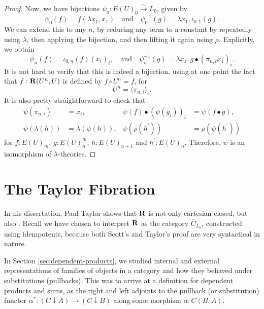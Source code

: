 \begin{proof}
  Now, we have bijections $ \psi_0: E(U)_0 \xrightarrow{\sim} L_0 $, given by
  \[ \psi_0(f) = f (\lambda x_1, x_1) \quad \text{and} \quad \psi_0^{-1}(g) = \lambda x_1, \iota_{0, 1}(g). \]
  We can extend this to any $ n $, by reducing any term to a constant by repeatedly using $ \lambda $, then applying the bijection, and then lifting it again using $ \rho $. Explicitly, we obtain
  \[ \psi_n(f) = \iota_{0, n}(f)(x_i)_i, \quad \text{and} \quad \psi^{-1}_n(g) = \lambda x_1, g \bullet (\pi_{n, i} x_1)_i. \]
  It is not hard to verify that this is indeed a bijection, using at one point the fact that $ f: \mathbf{R}(U^n, U) $ is defined by $ f \circ U^n = f $, for
  \[ U^n = \langle \pi_{n, i} \rangle_i. \]
  It is also pretty straightforward to check that
  \begin{align*}
    \psi(\pi_{n, i}) &= x_i, & \psi(f) \bullet (\psi(g_i))_i &= \psi(f \bullet g),\\
    \psi(\lambda(h)) &= \lambda(\psi(h)), & \psi(\rho(h^\prime)) &= \rho(\psi(h^\prime))
  \end{align*}
  for $ f: E(U)_m $, $ g: E(U)_n^m $, $ h: E(U)_{n + 1} $ and $ h^\prime : E(U)_n $. Therefore, $ \psi $ is an isomorphism of $ \lambda $-theories.
\end{proof}

\section{The Taylor Fibration}

In his dissertation, Paul Taylor shows that $ \mathbf{R} $ is not only cartesian closed, but also . Recall we have chosen to interpret $ \mathbf{R} $ as the category $ \overline C_{L_0} $, constructed using idempotents, because both Scott's and Taylor's proof are very syntactical in nature.

In Section \ref{sec:dependent-products}, we studied internal and external representations of families of objects in a category and how they behaved under substitutions (pullbacks). This was to arrive at a definition for dependent products and sums, as the right and left adjoints to the pullback (or substitution) functor $ \alpha^*: (C \downarrow A) \to (C \downarrow B) $ along some morphism $ \alpha : C(B, A) $.

